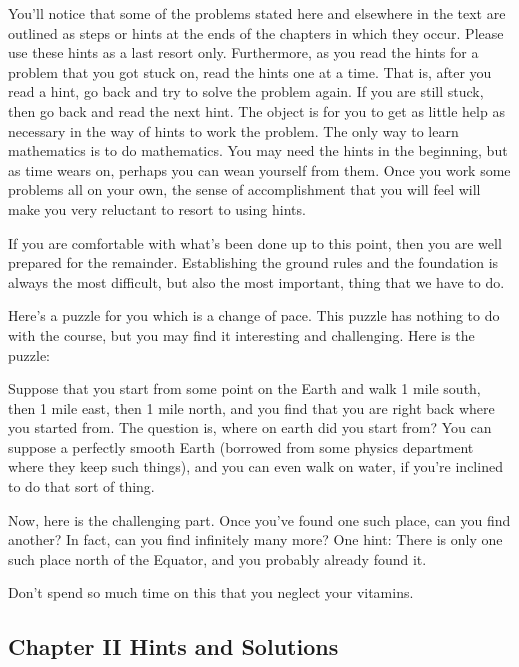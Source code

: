 \documentclass[english]{book}
\begin{document}
You'll notice that some of the problems stated here and elsewhere in the text are outlined as steps or hints at the ends of the chapters in which they occur. Please use these hints as a last resort only. Furthermore, as you read the hints for a problem that you got stuck on, read the hints one at a time. That is, after you read a hint, go back and try to solve the problem again. If you are still stuck, then go back and read the next hint. The object is for you to get as little help as necessary in the way of hints to work the problem. The only way to learn mathematics is to do mathematics. You may need the hints in the beginning, but as time wears on, perhaps you can wean yourself from them. Once you work some problems all on your own, the sense of accomplishment that you will feel will make you very reluctant to resort to using hints.

If you are comfortable with what's been done up to this point, then you are well prepared for the remainder. Establishing the ground rules and the foundation is always the most difficult, but also the most important, thing that we have to do.

\vspace{0.3cm}

Here's a puzzle for you which is a change of pace. This puzzle has nothing to do with the course, but you may find it interesting and challenging. Here is the puzzle:

Suppose that you start from some point on the Earth and walk 1 mile south, then 1 mile east, then 1 mile north, and you find that you are right back where you started from. The question is, where on earth did you start from? You can suppose a perfectly smooth Earth (borrowed from some physics department where they keep such things), and you can even walk on water, if you're inclined to do that sort of thing.

Now, here is the challenging part. Once you've found one such place, can you find another? In fact, can you find infinitely many more? One hint: There is only one such place north of the Equator, and you probably already found it. 

Don't spend so much time on this that you neglect your vitamins.



\newpage
\begin{center}
\section*{Chapter II Hints and Solutions}
\end{center}
\end{document}

